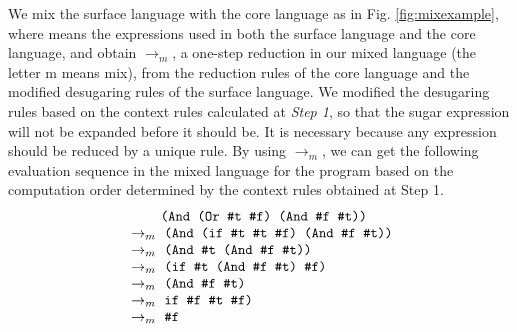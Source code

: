 We mix the surface language with the core language as in Fig. \ref{fig:mixexample}, where  means the expressions used in both the surface language and the core language, and obtain $\to_m$, a one-step reduction in our mixed language (the letter m means mix), from the reduction rules of the core language and the modified desugaring rules of the surface language. We modified the desugaring rules based on the context rules calculated at {\em Step 1}, so that the sugar expression will not be expanded before it should be. It is necessary because any expression should be reduced by a unique rule. By using $\to_m$, we can get the following evaluation sequence in the mixed language for
the program  based on the computation order determined by the context rules obtained at Step 1.
\[
    \begin{array}{ll}
        \qquad\;\,\texttt{(And (Or \#t~\#f) (And \#f~\#t))}\\
        ~\rightarrow_m~\texttt{(And (if \#t~\#t~\#f) (And \#f~\#t))}\\
        ~\rightarrow_m~\texttt{(And \#t~(And \#f~\#t))}\\
        ~\rightarrow_m~\texttt{(if \#t~(And \#f~\#t) \#f)}\\
        ~\rightarrow_m~\texttt{(And \#f~\#t)}\\
        ~\rightarrow_m~\texttt{if \#f~\#t~\#f)}\\
        ~\rightarrow_m~\texttt{\#f}\\
    \end{array}
\]





